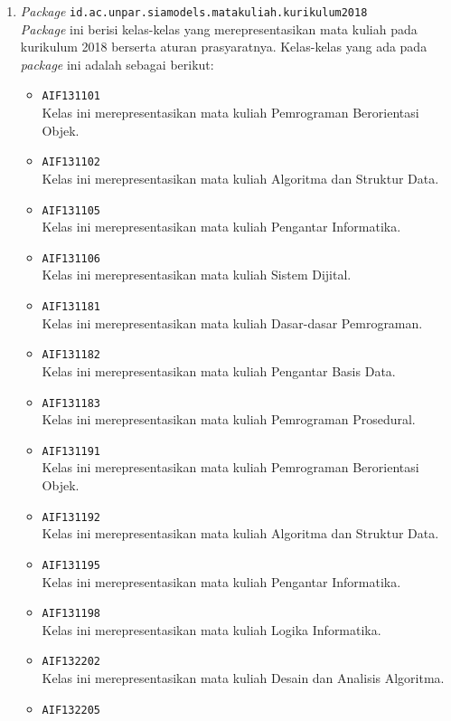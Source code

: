 \begin{enumerate}
	\item \textit{Package} \texttt{id.ac.unpar.siamodels.matakuliah.kurikulum2018} \\
	\textit{Package} ini berisi kelas-kelas yang merepresentasikan mata kuliah pada kurikulum 2018 berserta aturan prasyaratnya. Kelas-kelas yang ada pada \textit{package} ini adalah sebagai berikut:
	\begin{itemize}
		\item \texttt{AIF131101} \\
Kelas ini merepresentasikan mata kuliah Pemrograman Berorientasi Objek.
\item \texttt{AIF131102} \\
Kelas ini merepresentasikan mata kuliah Algoritma dan Struktur Data.
\item \texttt{AIF131105} \\
Kelas ini merepresentasikan mata kuliah Pengantar Informatika.
\item \texttt{AIF131106} \\
Kelas ini merepresentasikan mata kuliah Sistem Dijital.
\item \texttt{AIF131181} \\
Kelas ini merepresentasikan mata kuliah Dasar-dasar Pemrograman.
\item \texttt{AIF131182} \\
Kelas ini merepresentasikan mata kuliah Pengantar Basis Data.
\item \texttt{AIF131183} \\
Kelas ini merepresentasikan mata kuliah Pemrograman Prosedural.
\item \texttt{AIF131191} \\
Kelas ini merepresentasikan mata kuliah Pemrograman Berorientasi Objek.
\item \texttt{AIF131192} \\
Kelas ini merepresentasikan mata kuliah Algoritma dan Struktur Data.
\item \texttt{AIF131195} \\
Kelas ini merepresentasikan mata kuliah Pengantar Informatika.
\item \texttt{AIF131198} \\
Kelas ini merepresentasikan mata kuliah Logika Informatika.
\item \texttt{AIF132202} \\
Kelas ini merepresentasikan mata kuliah Desain dan Analisis Algoritma.
\item \texttt{AIF132205} \\

\end{itemize}
\end{enumerate}
